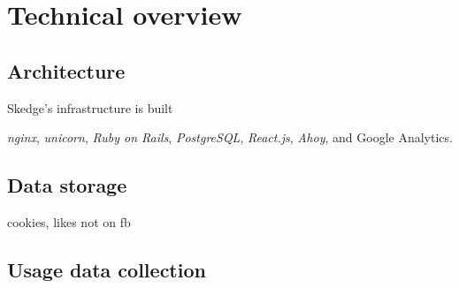 
\chapter{Technical overview}

\section{Architecture}

Skedge's infrastructure is built 

\emph{nginx}, \emph{unicorn}, \emph{Ruby on Rails}, \emph{PostgreSQL}, \emph{React.js}, \emph{Ahoy}, and Google Analytics.

\section{Data storage}

cookies, likes not on fb

\section{Usage data collection}
